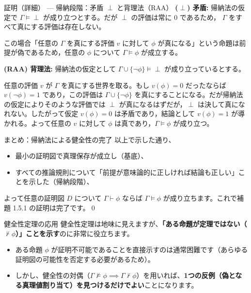 \documentclass[unicode,10pt]{beamer}
\begin{document}
\begin{frame}{証明（詳細） — 帰納段階：矛盾 $\perp$ と背理法（RAA）}
    \textbf{($\perp$) 矛盾:}
    帰納法の仮定で $\Gamma\models\perp$ が成り立つとする。だが $\perp$ の評価は常に 0 であるため，
    $\Gamma$ をすべて真にする評価は存在しない。

    この場合「任意の $\Gamma$ を真にする評価 $v$ に対して $\phi$ が真になる」という命題は前提が偽であるため，任意の $\phi$ について $\Gamma\models\phi$ が成立する。

    \textbf{(RAA) 背理法:}
    帰納法の仮定として $\Gamma\cup\{\neg\phi\}\models\perp$ が成り立っているとする。

    任意の評価 $v$ が $\Gamma$ を真にする世界を取る。もし $v(\phi)=0$ だったならば $v(\neg\phi)=1$ であり，この評価は $\Gamma\cup\{\neg\phi\}$ を真にすることになる。だが帰納法の仮定によりそのような評価では $\perp$ が真になるはずだが，$\perp$ は決して真になれない。したがって仮定 $v(\phi)=0$ は矛盾であり，結論として $v(\phi)=1$ が導かれる。よって任意の $v$ に対して $\phi$ は真であり，$\Gamma\models\phi$ が成り立つ。
\end{frame}

\begin{frame}{まとめ：帰納法による健全性の完了}
    以上で示した通り、
    \begin{itemize}
        \item 最小の証明図で真理保存が成立し（基底）、
        \item すべての推論規則について「前提が意味論的に正しければ結論も正しい」ことを示した（帰納段階）、
    \end{itemize}
    よって任意の証明図 $D$ について $\Gamma\vdash\phi$ ならば $\Gamma\models\phi$ が成り立ちます。これで補題 1.5.1 の証明は完了です。\qed
\end{frame}

\begin{frame}{健全性定理の応用}
    健全性定理は地味に見えますが、\textbf{「ある命題が定理ではない（$\not\vdash \phi$）」ことを示す}のに非常に役立ちます。

    \begin{itemize}
        \item ある命題 $\phi$ が証明不可能であることを直接示すのは通常困難です（あらゆる証明図の可能性を否定する必要があるため）。
        \item しかし、健全性の対偶（$\Gamma \not\models \phi \implies \Gamma \not\vdash \phi$）を用いれば、\textbf{1つの反例（偽となる真理値割り当て）を見つけるだけでよい}ことになります。
    \end{itemize}
\end{frame}
\end{document}
